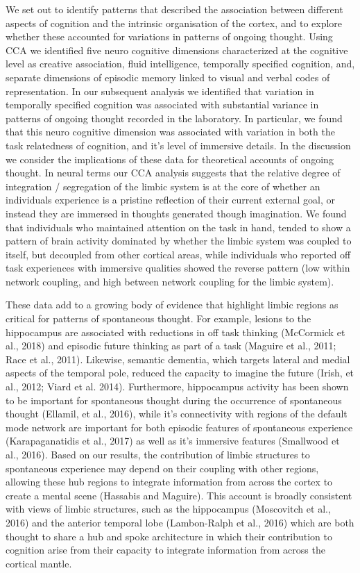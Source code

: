 We set out to identify patterns that described the association between different aspects of cognition and the intrinsic organisation of the cortex, and to explore whether these accounted for variations in patterns of ongoing thought. Using CCA we identified five neuro cognitive dimensions characterized at the cognitive level as creative association, fluid intelligence, temporally specified cognition, and, separate dimensions of episodic memory linked to visual and verbal codes of representation. In our subsequent analysis we identified that variation in temporally specified cognition was associated with substantial variance in patterns of ongoing thought recorded in the laboratory. In particular, we found that this neuro cognitive dimension was associated with variation in both the task relatedness of cognition, and it’s level of immersive details. In the discussion we consider the implications of these data for theoretical accounts of ongoing thought.
In neural terms our CCA analysis suggests that the relative degree of integration / segregation of the limbic system is at the core of whether an individuals experience is a pristine reflection of their current external goal, or instead they are immersed in thoughts generated though imagination. We found that individuals who maintained attention on the task in hand, tended to show a pattern of brain activity dominated by whether the limbic system was coupled to itself, but decoupled from other cortical areas, while individuals who reported off task experiences with immersive qualities showed the reverse pattern (low within network coupling, and high between network coupling for the limbic system). 

These data add to a growing body of evidence that highlight limbic regions as critical for patterns of spontaneous thought. For example, lesions to the hippocampus are associated with reductions in off task thinking (McCormick et al., 2018) and episodic future thinking as part of a task (Maguire et al., 2011; Race et al., 2011). Likewise, semantic dementia, which targets lateral and medial aspects of the temporal pole, reduced the capacity to imagine the future (Irish, et al., 2012; Viard et al. 2014). Furthermore, hippocampus activity has been shown to be important for spontaneous thought during the occurrence of spontaneous thought (Ellamil, et al., 2016), while it’s connectivity with regions of the default mode network are important for both episodic features of spontaneous experience (Karapaganatidis et al., 2017) as well as it’s immersive features (Smallwood et al., 2016). Based on our results, the contribution of limbic structures to spontaneous experience may depend on their coupling with other regions, allowing these hub regions to integrate information from across the cortex to create a mental scene (Hassabis and Maguire). This account is broadly consistent with views of limbic structures, such as the hippocampus (Moscovitch et al., 2016) and the anterior temporal lobe (Lambon-Ralph et al., 2016) which are both thought to share a hub and spoke architecture in which their contribution to cognition arise from their capacity to integrate information from across the cortical mantle. 

